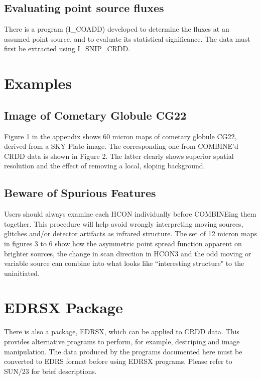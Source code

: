\subsection{Evaluating point source fluxes}

There is a program (I\_COADD) developed to determine the fluxes at an assumed
point source, and to evaluate its statistical significance. The data must
first be extracted using I\_SNIP\_CRDD.

\section {Examples}

\subsection {Image of Cometary Globule CG22}

Figure 1 in the appendix shows 60 micron maps of cometary globule CG22, derived
from a SKY Plate image. The corresponding one from COMBINE'd CRDD data is shown
in Figure 2. The latter clearly shows superior spatial resolution and the
effect of removing a local, sloping background.

\subsection {Beware of Spurious Features}

Users should always examine each HCON individually before COMBINEing them
together. This procedure will help avoid wrongly interpreting moving sources,
glitches and/or detector artifacts as infrared structure. The set of 12 micron
maps in figures 3 to 6 show how the asymmetric point spread function apparent
on brighter sources, the change in scan direction in HCON3 and the odd moving
or variable source can combine into what looks like ``interesting structure" to
the uninitiated.

\section {EDRSX Package}

There is also a package, EDRSX, which can be applied to CRDD data. This provides
alternative programs to perform, for example, destriping and image
manipulation. The data produced by the programs documented here must be
converted to EDRS format before using EDRSX programs. Please refer to SUN/23 for
brief descriptions.

